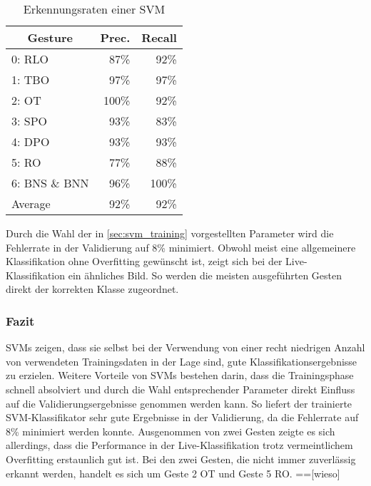 \begin{table}[h]
\centering
\begin{tabular}{lrr}
\hline
 \multicolumn{1}{c}{\textbf{Gesture}} & \multicolumn{1}{c}{\textbf{Prec.}} & \multicolumn{1}{c}{\textbf{Recall}} \\
 \hline
  0: \ac{RLO} & 87\% & 92\% \\
 \hline
  1: \ac{TBO} & 97\% & 97\% \\
 \hline
  2: \ac{OT} & 100\% & 92\% \\
 \hline
  3: \ac{SPO} & 93\% & 83\% \\
 \hline
  4: \ac{DPO} & 93\% & 93\% \\
 \hline
  5: \ac{RO} & 77\% & 88\% \\
 \hline
  6: \ac{BNS} \& \ac{BNN} & 96\% & 100\% \\
 \hline
  Average & 92\% & 92\% \\
 \hline
\end{tabular}
\caption[Erkennungsraten einer SVM]{Erkennungsraten einer SVM}
\label{tab:svm_performance}
\end{table}

Durch die Wahl der in \autoref{sec:svm_training} vorgestellten Parameter wird die Fehlerrate in der Validierung auf 8\% minimiert.
Obwohl meist eine allgemeinere Klassifikation ohne Overfitting gewünscht ist, zeigt sich bei der Live-Klassifikation ein ähnliches Bild.
So werden die meisten ausgeführten Gesten direkt der korrekten Klasse zugeordnet.


\subsubsection{Fazit}\label{sec:svm_conclusion}
\ac{SVMs} zeigen, dass sie selbst bei der Verwendung von einer recht niedrigen Anzahl von verwendeten Trainingsdaten in der Lage sind, gute Klassifikationsergebnisse zu erzielen.
Weitere Vorteile von \ac{SVMs} bestehen darin, dass die Trainingsphase schnell absolviert und durch die Wahl entsprechender Parameter direkt Einfluss auf die Validierungsergebnisse genommen werden kann.
So liefert der trainierte \ac{SVM}-Klassifikator sehr gute Ergebnisse in der Validierung, da die Fehlerrate auf 8\% minimiert werden konnte.
Ausgenommen von zwei Gesten zeigte es sich allerdings, dass die Performance in der Live-Klassifikation trotz vermeintlichem Overfitting erstaunlich gut ist.
Bei den zwei Gesten, die nicht immer zuverlässig erkannt werden, handelt es sich um Geste 2 \ac{OT} und Geste 5 \ac{RO}.
==[wieso]


